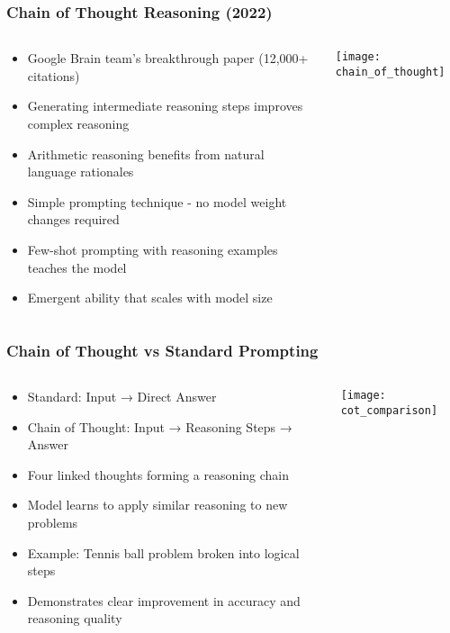 \begin{frame}[fragile]\frametitle{Chain of Thought Reasoning (2022)}
\begin{columns}
    \begin{column}[T]{0.6\linewidth}
      \begin{itemize}
        \item Google Brain team's breakthrough paper (12,000+ citations)
        \item Generating intermediate reasoning steps improves complex reasoning
        \item Arithmetic reasoning benefits from natural language rationales
        \item Simple prompting technique - no model weight changes required
        \item Few-shot prompting with reasoning examples teaches the model
        \item Emergent ability that scales with model size
      \end{itemize}
    \end{column}
    \begin{column}[T]{0.4\linewidth}
        \begin{center}
        \texttt{[image: chain\_of\_thought]}
        \end{center}	
    \end{column}
  \end{columns}
\end{frame}

\begin{frame}[fragile]\frametitle{Chain of Thought vs Standard Prompting}
\begin{columns}
    \begin{column}[T]{0.6\linewidth}
      \begin{itemize}
        \item Standard: Input → Direct Answer
        \item Chain of Thought: Input → Reasoning Steps → Answer
        \item Four linked thoughts forming a reasoning chain
        \item Model learns to apply similar reasoning to new problems
        \item Example: Tennis ball problem broken into logical steps
        \item Demonstrates clear improvement in accuracy and reasoning quality
      \end{itemize}
    \end{column}
    \begin{column}[T]{0.4\linewidth}
        \begin{center}
        \texttt{[image: cot\_comparison]}
        \end{center}	
    \end{column}
  \end{columns}
\end{frame}

